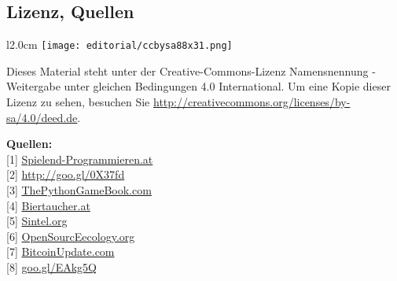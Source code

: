 \subsection*{Lizenz, Quellen} 
\begin{wrapfigure}{l}{2.0cm}
\texttt{[image: editorial/ccbysa88x31.png]}
\end{wrapfigure}
Dieses Material steht unter der Creative-Commons-Lizenz Namensnennung - Weitergabe unter gleichen Bedingungen 4.0 International. Um eine Kopie dieser Lizenz zu sehen, besuchen Sie \url{http://creativecommons.org/licenses/by-sa/4.0/deed.de}.

\textbf{Quellen:} \\
{[}1{]} \href{http://spielend-programmieren.at}{Spielend-Programmieren.at} \\
{[}2{]} \href{http://spielend-programmieren.at/de:tutorials:start}{http://goo.gl/0X37fd} \\
{[}3{]} \href{http://thepythongamebook.com}{ThePythonGameBook.com} \\
{[}4{]} \href{http://biertaucher.at}{Biertaucher.at} \\
{[}5{]} \href{http://www.sintel.org/}{Sintel.org} \\
{[}6{]} \href{http://opensourceecology.org/}{OpenSourcEecology.org} \\
{[}7{]} \href{http://www.bitcoinupdate.com/}{BitcoinUpdate.com} \\
{[}8{]} \href{http://www.amazon.de/gp/product/1449388396/ref=as_li_ss_tl?ie=UTF8&camp=1638&creative=19454&creativeASIN=1449388396&linkCode=as2&tag=spielendprogr-21}{goo.gl/EAkg5Q} \\










